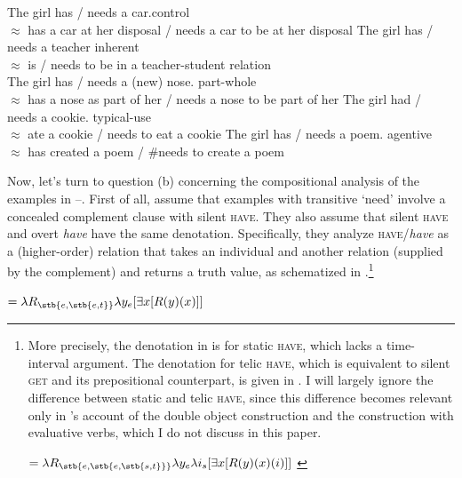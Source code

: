 \documentclass[output=paper,colorlinks,citecolor=brown]{langscibook}
\begin{document}
\ea \label{have-R}
\ea The girl has / needs a car.\hfill control\label{control}\\
$\approx$ has a car at her disposal / needs a car to be at her disposal
\ex The girl has / needs a teacher  \hfill inherent \label{inherent}\\
$\approx$ is / needs to be in a teacher-student relation\\
\ex The girl has / needs a (new) nose. \hfill part-whole\label{part-whole}\\
$\approx$ has a nose as part of her / needs a nose to be part of her
\ex The girl had / needs a cookie. \hfill typical-use\\
$\approx$ ate a cookie / needs to eat a cookie\label{typical-use}
\ex The girl has / needs a poem. \hfill agentive \label{agentive}\\
$\approx$ has created a poem / \#needs to create a poem
\z\z

\noindent Now, let's turn to question (b) concerning the compositional analysis of the examples in --. First of all, \citet{Zaroukian.Beller2013} assume that examples with transitive `need' involve a concealed complement clause with silent \textsc{have}. They also assume that silent \textsc{have} and overt \textit{have} have the same denotation. Specifically, they analyze \textsc{have}/\textit{have} as a (higher-order) relation that takes an individual and another relation (supplied by the complement) and returns a truth value, as schematized in .\footnote{More precisely, the denotation in  is for static \textsc{have}, which lacks a time-interval argument. The denotation for telic \textsc{have}, which is equivalent to  silent \textsc{get} and its prepositional counterpart, is given in . I will largely ignore the difference between static and telic \textsc{have}, since this difference becomes relevant only in \citeauthor{Zaroukian.Beller2013}'s account of the double object construction and the construction with evaluative verbs, which I do not discuss in this paper.

\ea\label{have-telic-formula}
 $= \lambda R_{\stb{e,\stb{e,\stb{s,t}}}} \lambda y_e \lambda i_s [\exists x [R(y)(x)(i)]]$ \hfill \citep[648]{Zaroukian.Beller2013}
\z
}

\ea\label{have-formula}
 $= \lambda R_{\stb{e,\stb{e,t}}} \lambda y_e [\exists x [R(y)(x)]]$ \hfill \citep[649]{Zaroukian.Beller2013}
\z
\end{document}
